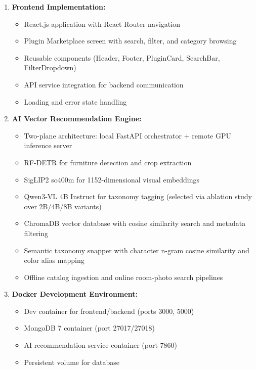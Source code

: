 \begin{enumerate}
    \item \textbf{Frontend Implementation:}
    \begin{itemize}
        \item React.js application with React Router navigation
        \item Plugin Marketplace screen with search, filter, and category browsing
        \item Reusable components (Header, Footer, PluginCard, SearchBar, FilterDropdown)
        \item API service integration for backend communication
        \item Loading and error state handling
    \end{itemize}
    
    \item \textbf{AI Vector Recommendation Engine:}
    \begin{itemize}
        \item Two-plane architecture: local FastAPI orchestrator + remote GPU inference server
        \item RF-DETR for furniture detection and crop extraction
        \item SigLIP2 so400m for 1152-dimensional visual embeddings
        \item Qwen3-VL 4B Instruct for taxonomy tagging (selected via ablation study over 2B/4B/8B variants)
        \item ChromaDB vector database with cosine similarity search and metadata filtering
        \item Semantic taxonomy snapper with character n-gram cosine similarity and color alias mapping
        \item Offline catalog ingestion and online room-photo search pipelines
    \end{itemize}
    
    \item \textbf{Docker Development Environment:}
    \begin{itemize}
        \item Dev container for frontend/backend (ports 3000, 5000)
        \item MongoDB 7 container (port 27017/27018)
        \item AI recommendation service container (port 7860)
        \item Persistent volume for database
    \end{itemize}
\end{enumerate}

